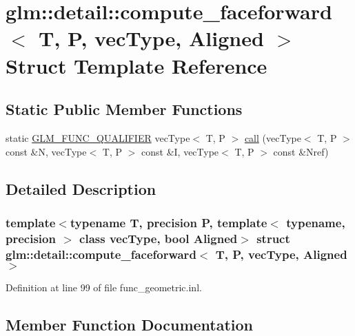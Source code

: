 \hypertarget{structglm_1_1detail_1_1compute__faceforward}{}\section{glm\+::detail\+::compute\+\_\+faceforward$<$ T, P, vec\+Type, Aligned $>$ Struct Template Reference}
\label{structglm_1_1detail_1_1compute__faceforward}
\subsection*{Static Public Member Functions}
\begin{DoxyCompactItemize}
\item 
static \mbox{\hyperlink{setup_8hpp_a33fdea6f91c5f834105f7415e2a64407}{G\+L\+M\+\_\+\+F\+U\+N\+C\+\_\+\+Q\+U\+A\+L\+I\+F\+I\+ER}} vec\+Type$<$ T, P $>$ \mbox{\hyperlink{structglm_1_1detail_1_1compute__faceforward_a87e2bbf8af0c5f6945c4fa54a9d0856d}{call}} (vec\+Type$<$ T, P $>$ const \&N, vec\+Type$<$ T, P $>$ const \&I, vec\+Type$<$ T, P $>$ const \&Nref)
\end{DoxyCompactItemize}


\subsection{Detailed Description}
\subsubsection*{template$<$typename T, precision P, template$<$ typename, precision $>$ class vec\+Type, bool Aligned$>$\newline
struct glm\+::detail\+::compute\+\_\+faceforward$<$ T, P, vec\+Type, Aligned $>$}



Definition at line 99 of file func\+\_\+geometric.\+inl.



\subsection{Member Function Documentation}
\mbox{\label{structglm_1_1detail_1_1compute__faceforward_a87e2bbf8af0c5f6945c4fa54a9d0856d}} 
